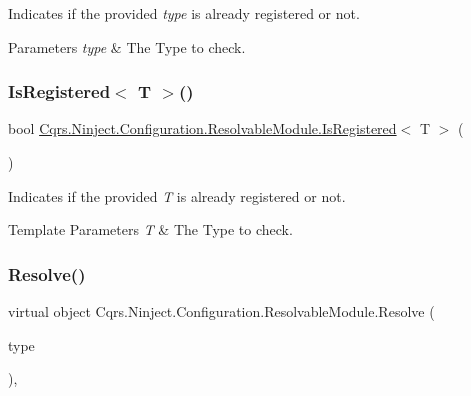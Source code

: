 Indicates if the provided {\itshape type}  is already registered or not. 


\begin{DoxyParams}{Parameters}
{\em type} & The Type to check.\\
\hline
\end{DoxyParams}
\mbox{\label{classCqrs_1_1Ninject_1_1Configuration_1_1ResolvableModule_a622339cf7b08ce97d23c9b2f00cedea3_a622339cf7b08ce97d23c9b2f00cedea3}} 
\subsubsection{\texorpdfstring{Is\+Registered$<$ T $>$()}{IsRegistered< T >()}}
{\footnotesize\ttfamily bool \hyperlink{classCqrs_1_1Ninject_1_1Configuration_1_1ResolvableModule_ae5b77cb7b9b0b826a603fea25609a1ac_ae5b77cb7b9b0b826a603fea25609a1ac}{Cqrs.\+Ninject.\+Configuration.\+Resolvable\+Module.\+Is\+Registered}$<$ T $>$ (\begin{DoxyParamCaption}{ }\end{DoxyParamCaption})}



Indicates if the provided {\itshape T}  is already registered or not. 


\begin{DoxyTemplParams}{Template Parameters}
{\em T} & The Type to check.\\
\hline
\end{DoxyTemplParams}
\mbox{\label{classCqrs_1_1Ninject_1_1Configuration_1_1ResolvableModule_a182fa5666c70e6871aa371fc81fb788d_a182fa5666c70e6871aa371fc81fb788d}} 
\subsubsection{\texorpdfstring{Resolve()}{Resolve()}}
{\footnotesize\ttfamily virtual object Cqrs.\+Ninject.\+Configuration.\+Resolvable\+Module.\+Resolve (\begin{DoxyParamCaption}\item[{Type}]{type }\end{DoxyParamCaption})\hspace{0.3cm}{\ttfamily [protected]}, {\ttfamily [virtual]}}



